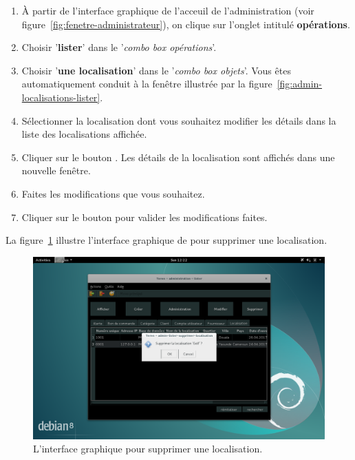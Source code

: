 \begin{enumerate}[1)]
	\item \`A partir de l'interface graphique de l'acceuil de
		l'administration (voir figure~\ref{fig:fenetre-administrateur}),
		on clique sur l'onglet intitul\'e \textbf{op\'erations}. 
		
	\item Choisir '\textbf{lister}' dans le '\emph{combo box
		op\'erations}'.
		
	\item Choisir '\textbf{une localisation}' dans
		le '\emph{combo box objets}'. Vous \^etes automatiquement
		conduit \`a la fen\^etre illustr\'ee par la
		figure~\ref{fig:admin-localisations-lister}.
		
	\item S\'electionner la localisation dont vous souhaitez
		modifier les d\'etails dans la liste des localisations
		affich\'ee.
		
	\item Cliquer sur le bouton . Les d\'etails
		de la localisation sont affich\'es dans une nouvelle
		fen\^etre.
		
	\item Faites les modifications que vous souhaitez.
		
	\item Cliquer sur le bouton  pour valider
		les modifications faites.
\end{enumerate}


{}

La figure~\ref{fig:admin-localisations-supprimer} illustre
l'interface graphique de \yeroth pour supprimer une localisation.\\

\begin{figure}[!htpb]
	\centering
	\includegraphics[scale=0.35]{images/localisation-supprimer.png}
	\caption{L'interface graphique pour supprimer une localisation.}
	\label{fig:admin-localisations-supprimer}
\end{figure}

